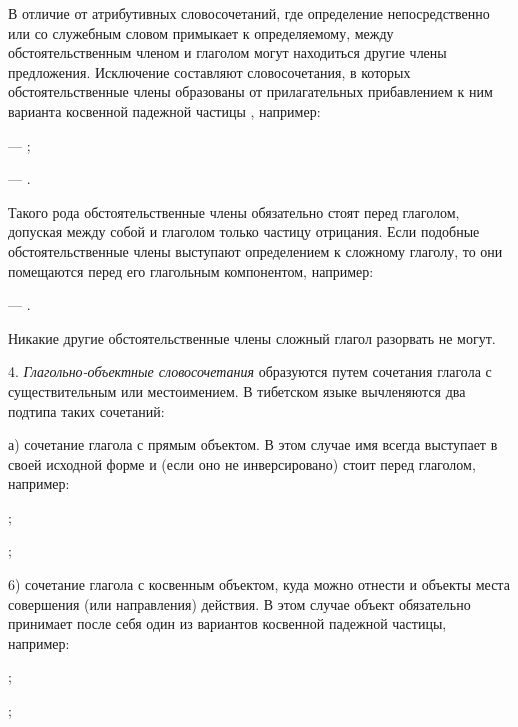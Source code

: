 В отличие от атрибутивных словосочетаний, где определение непосредственно или со служебным словом примыкает к определяемому, между обстоятельственным членом и глаголом могут находиться другие члены предложения. Исключение составляют словосочетания, в которых обстоятельственные члены образованы от прилагательных прибавлением к ним варианта косвенной падежной частицы , например:	
\begin{prfsample}
	\item {} --- ;
	\item {} --- .
\end{prfsample}
Такого рода обстоятельственные члены обязательно стоят перед глаголом, допуская между собой и глаголом только частицу отрицания. Если подобные обстоятельственные члены выступают определением к сложному глаголу, то они помещаются перед его глагольным компонентом, например:
\begin{prfsample}
	\item {} --- .
\end{prfsample}
Никакие другие обстоятельственные члены сложный глагол разорвать не могут.

4. \emph{Глагольно-объектные словосочетания} образуются путем сочетания глагола с существительным или местоимением. В тибетском языке вычленяются два подтипа таких сочетаний:

а) сочетание глагола с прямым объектом. В этом случае имя всегда выступает в своей исходной форме и (если оно не инверсировано) стоит перед глаголом, например:
\begin{prfsample}
	\item {};
	\item {};
\end{prfsample}
6) сочетание глагола с косвенным объектом, куда можно отнести и объекты места совершения (или направления) действия. В этом случае объект обязательно принимает после себя один из вариантов косвенной падежной частицы, например:
\begin{prfsample}
	\item {};
	\item {};
\end{prfsample}

